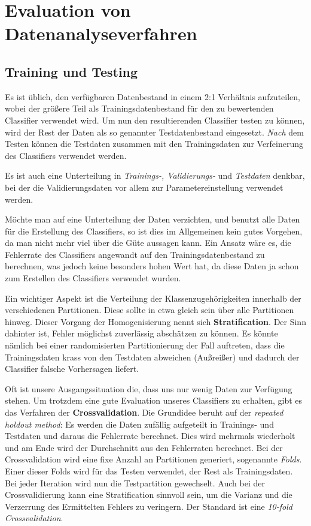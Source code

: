 \section{Evaluation von Datenanalyseverfahren}

\subsection{Training und Testing}
Es ist üblich, den verfügbaren Datenbestand in einem 2:1 Verhältnis aufzuteilen,
wobei der größere Teil als Trainingsdatenbestand für den zu bewertenden Classifier
verwendet wird. Um nun den resultierenden Classifier testen zu können, wird der
Rest der Daten als so genannter Testdatenbestand eingesetzt.
\textit{Nach} dem Testen können die Testdaten zusammen mit den Trainingsdaten zur 
Verfeinerung des Classifiers verwendet werden.

Es ist auch eine Unterteilung in \textit{Trainings-, Validierungs-} und 
\textit{Testdaten} denkbar, bei der die Validierungsdaten vor allem zur Parametereinstellung
verwendet werden. 

Möchte man auf eine Unterteilung der Daten verzichten, und benutzt alle Daten für
die Erstellung des Classifiers, so ist dies im Allgemeinen kein gutes Vorgehen,
da man nicht mehr viel über die Güte aussagen kann. Ein Ansatz wäre es, die
Fehlerrate des Classifiers angewandt auf den Trainingsdatenbestand zu berechnen,
was jedoch keine besonders hohen Wert hat, da diese Daten ja schon zum Erstellen des
Classifiers verwendet wurden.

Ein wichtiger Aspekt ist die Verteilung der Klassenzugehörigkeiten innerhalb der
verschiedenen Partitionen. Diese sollte in etwa gleich sein über alle Partitionen
hinweg. Dieser Vorgang der Homogenisierung nennt sich \textbf{Stratification}.
Der Sinn dahinter ist, Fehler möglichst zuverlässig abschätzen zu können. 
Es könnte nämlich bei einer randomisierten Partitionierung der Fall 
auftreten, dass die Trainingsdaten krass von den Testdaten abweichen (Außreißer) 
und dadurch der Classifier falsche Vorhersagen liefert.

Oft ist unsere Ausgangssituation die, dass uns nur wenig Daten zur Verfügung
stehen. Um trotzdem eine gute Evaluation unseres Classifiers zu erhalten, gibt es
das Verfahren der \textbf{Crossvalidation}. Die Grundidee beruht auf der 
\textit{repeated holdout method}: Es werden die Daten zufällig aufgeteilt in
Trainings- und Testdaten und daraus die Fehlerrate berechnet. Dies wird mehrmals
wiederholt und am Ende wird der Durchschnitt aus den Fehlerraten berechnet.
Bei der Crossvalidation wird eine fixe Anzahl an Partitionen generiert, sogenannte
\textit{Folds}. Einer dieser Folds wird für das Testen verwendet, der Rest als
Trainingsdaten. Bei jeder Iteration wird nun die Testpartition gewechselt.
Auch bei der Crossvalidierung kann eine Stratification sinnvoll sein, um die
Varianz und die Verzerrung des Ermittelten Fehlers zu veringern. Der Standard
ist eine \textit{10-fold Crossvalidation}.

